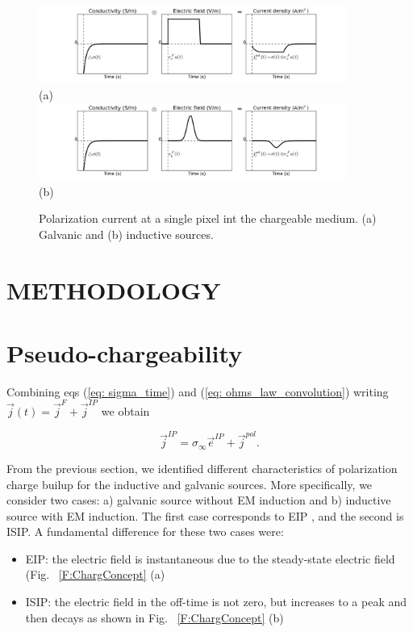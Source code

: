 \documentclass[letterpaper,11pt]{article}
\newcommand{\siginf}{\sigma_\infty}
\renewcommand {\j}  { {\vec j} }
\newcommand {\e}  { {\vec e} }
\begin{document}
\begin{figure}  
  \centering
  \includegraphics[width=0.9\textwidth]{figures/jpolDC.png}\\ 
  (a) \\
  \includegraphics[width=0.9\textwidth]{figures/jpolEM.png} \\
  (b)
  \caption{Polarization current at a single pixel int the chargeable medium. (a) Galvanic and (b) inductive sources.}
  \label{F:jpolDCEM}
\end{figure}   
\clearpage


\section{METHODOLOGY}
\section{Pseudo-chargeability}
Combining eqs (\ref{eq: sigma_time}) and  (\ref{eq: ohms_law_convolution}) writing $\j(t)=\j^F + \j^{IP}$ we obtain
\begin{linenomath*}
\begin{equation}
  \j^{IP} = \siginf \e^{IP} + \j^{pol}.
  \label{eq:IP_current}
\end{equation}
\end{linenomath*}
From the previous section, we identified different characteristics of polarization charge builup for the inductive and galvanic sources. 
More specifically, we consider two cases: a) galvanic source without EM induction and b) inductive source with EM induction. The first case corresponds to EIP \cite[]{seigel1959}, and the second is ISIP.
A fundamental difference for these two cases were: 
\begin{itemize}
  \item EIP: the electric field is instantaneous due to the steady-state electric field (Fig. ~\ref{F:ChargConcept} (a)
  \item ISIP:  the electric field in the off-time is not zero, but increases to a peak and then decays as shown in Fig. ~\ref{F:ChargConcept} (b)
\end{itemize}
\end{document}
